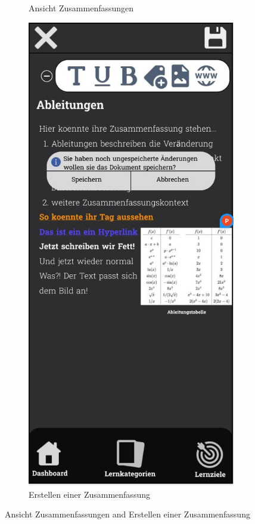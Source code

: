 \begin{figure}[htbp]
\begin{subfigure}[b]{0.45\linewidth}
          \caption{Ansicht Zusammenfassungen}
          \label{fig:zusammenfassungen-ansicht}
        \end{subfigure}
        \hfill
        \begin{subfigure}[b]{0.45\linewidth}
          \centering
          \includegraphics[width=\linewidth]{images/Mockups/Summaries_Look.JPG}
          \caption{Erstellen einer Zusammenfassung}
          \label{fig:zusammenfassungen-erstellen}
        \end{subfigure}
        \caption{Ansicht Zusammenfassungen and Erstellen einer Zusammenfassung}
        \label{fig:zusammenfassungen}
      \end{figure}

